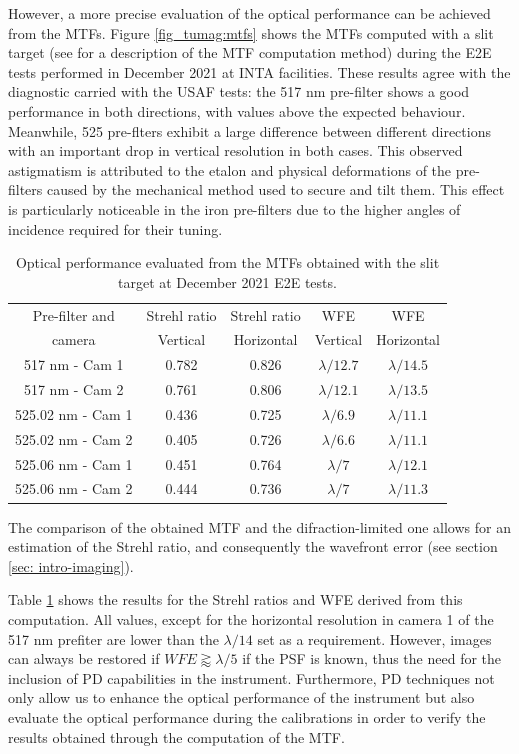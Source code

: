 However, a more precise evaluation of the optical performance can be achieved from the MTFs. Figure \ref{fig_tumag:mtfs} shows the MTFs computed with a slit target (see \cite{slanted-method} for a description of the MTF computation method) during the E2E tests performed in December 2021 at INTA facilities. These results agree with the diagnostic carried with the USAF tests: the 517 nm pre-filter shows a good performance in both directions, with values above the expected behaviour. Meanwhile, 525 pre-flters exhibit a large difference between different directions with an important drop in vertical resolution in both cases. This observed astigmatism is attributed to the etalon and physical deformations of the pre-filters caused by the mechanical method used to secure and tilt them. This effect is particularly noticeable in the iron pre-filters due to the higher angles of incidence required for their tuning.

\begin{table}[t]
    \centering
   \begin{tabular}{ccccc}
    \hline
    \hline
    Pre-filter and & Strehl ratio & Strehl ratio & WFE& WFE\\
    camera & Vertical & Horizontal & Vertical & Horizontal\\
    \hline
    517 nm - Cam 1 & 0.782 & 0.826 & $\lambda/12.7$ & $\lambda/14.5$ \\
    517 nm - Cam 2 & 0.761 & 0.806 & $\lambda/12.1$ & $\lambda/13.5$ \\
    525.02 nm - Cam 1 & 0.436 & 0.725 & $\lambda/6.9$ & $\lambda/11.1$ \\
    525.02 nm - Cam 2 & 0.405 & 0.726 & $\lambda/6.6$ & $\lambda/11.1$ \\
    525.06 nm - Cam 1 & 0.451 & 0.764 & $\lambda/7$ & $\lambda/12.1$ \\
    525.06 nm - Cam 2 & 0.444 & 0.736 & $\lambda/7$ & $\lambda/11.3$ \\
    \hline
    \hline
    \end{tabular}
    \caption{Optical performance evaluated from the MTFs obtained with the slit target at December 2021 E2E tests.}
    \label{table: Optical-performance}
\end{table}


The comparison of the obtained MTF and the difraction-limited one allows for an estimation of the Strehl ratio, and consequently the wavefront error (see section \ref{sec: intro-imaging}).

Table \ref{table: Optical-performance} shows the results for the Strehl ratios and WFE derived from this computation. All values, except for the horizontal resolution in camera 1 of the 517 nm prefiter are lower than the $\lambda/14$ set as a requirement. However, images can always be restored if $WFE \gtrapprox \lambda / 5$ \citep{restoration-limit} if the PSF is known, thus the need for the inclusion of PD capabilities in the instrument. Furthermore, PD techniques not only allow us to enhance the optical performance of the instrument but also evaluate the optical performance during the calibrations in order to verify the results obtained through the computation of the MTF. 

